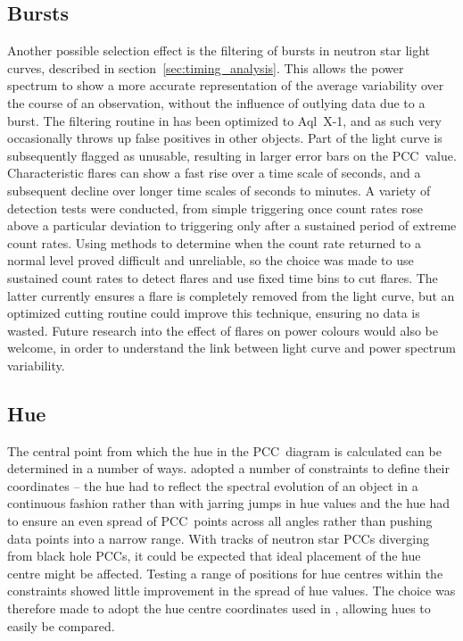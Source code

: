 \subsection{Bursts}
\label{sec:dis_bursts}
Another possible selection effect is the filtering of bursts in neutron star light curves, described in section~\ref{sec:timing_analysis}. This allows the power spectrum to show a more accurate representation of the average variability over the course of an observation, without the influence of outlying data due to a burst. The filtering routine in \chromos has been optimized to Aql~X-1, and as such very occasionally throws up false positives in other objects. Part of the light curve is subsequently flagged as unusable, resulting in larger error bars on the \ac{PCC}~value. Characteristic flares can show a fast rise over a time scale of seconds, and a subsequent decline over longer time scales of seconds to minutes. A variety of detection tests were conducted, from simple triggering once count rates rose above a particular deviation to triggering only after a sustained period of extreme count rates. Using methods to determine when the count rate returned to a normal level proved difficult and unreliable, so the choice was made to use sustained count rates to detect flares and use fixed time bins to cut flares. The latter currently ensures a flare is completely removed from the light curve, but an optimized cutting routine could improve this technique, ensuring no data is wasted. Future research into the effect of flares on power colours would also be welcome, in order to understand the link between light curve and power spectrum variability.\\

\enlargethispage{2\baselineskip}
\subsection{Hue}
The central point from which the hue in the \ac{PCC}~diagram is calculated can be determined in a number of ways. \citet{heil2015power} adopted a number of constraints to define their coordinates -- the hue had to reflect the spectral evolution of an object in a continuous fashion rather than with jarring jumps in hue values and the hue had to ensure an even spread of \ac{PCC}~points across all angles rather than pushing data points into a narrow range. With tracks of neutron star \acp{PCC} diverging from black hole \acp{PCC}, it could be expected that ideal placement of the hue centre might be affected. Testing a range of positions for hue centres within the constraints showed little improvement in the spread of hue values. The choice was therefore made to adopt the hue centre coordinates used in \citet{heil2015power}, allowing hues to easily be compared.\\

